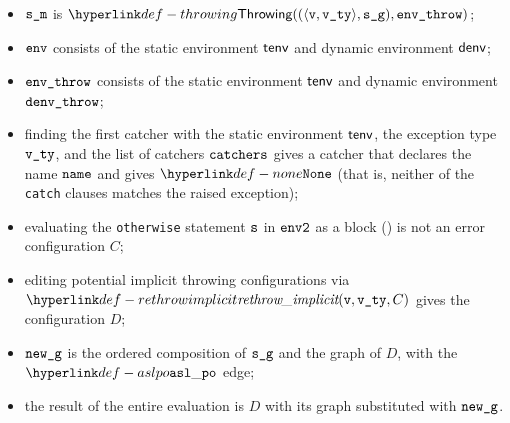 \ProseParagraph
\AllApply
\begin{itemize}
  \item $\sm$ is $\Throwing((\langle \vv, \vvty \rangle, \sg), \envthrow)$;
  \item $\env$ consists of the static environment $\tenv$ and dynamic environment $\denv$;
  \item $\envthrow$ consists of the static environment $\tenv$ and dynamic environment \\ $\denvthrow$;
  \item finding the first catcher with the static environment $\tenv$, the exception type $\vvty$,
        and the list of catchers $\catchers$ gives a catcher that declares the name $\name$ and gives $\None$
        (that is, neither of the \texttt{catch} clauses matches the raised exception);
  \item evaluating the \texttt{otherwise} statement $\vs$ in $\envtwo$ as a block ()
        is not an error configuration $C$\ProseOrDynErrorDiverging;
  \item editing potential implicit throwing configurations via $\rethrowimplicit(\vv, \vvty, C)$
        gives the configuration $D$;
  \item $\newg$ is the ordered composition of $\sg$ and the graph of $D$,
        with the $\aslpo$ edge;
  \item the result of the entire evaluation is $D$ with its graph substituted with $\newg$.
\end{itemize}

\FormallyParagraph
\begin{mathpar}
\end{mathpar}

